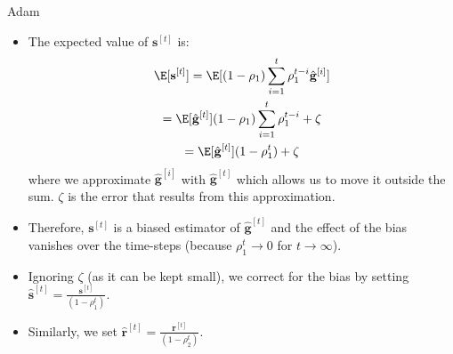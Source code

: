 \begin{vbframe}{Adam}
  
  \begin{itemize}
  \item The expected value  of $\mathbf{s}^{[t]}$ is:
  \footnotesize
  \begin{gather*}
    \E [\mathbf{s}^{[t]}] = \E [ (1 - \rho_1) \sum_{i=1}^t \rho_1^{t - i} \hat{\mathbf{g}}^{[i]}] \\
                = \E [\hat{\mathbf{g}}^{[t]}] (1 - \rho_1) \sum_{i=1}^t \rho_1^{t - i} + \zeta\\
                = \E [\hat{\mathbf{g}}^{[t]}] (1 - \rho_1^{t}) + \zeta
  \end{gather*}
  \normalsize
  where we approximate $\hat{\mathbf{g}}^{[i]}$ with $\hat{\mathbf{g}}^{[t]}$ which allows us to move it outside the sum. $\zeta$ is the error that results from this approximation.
      \item Therefore, $\mathbf{s}^{[t]}$ is a biased estimator of $\hat{\mathbf{g}}^{[t]}$ and the effect of the bias vanishes over the time-steps (because $\rho_1^t \rightarrow 0$ for $t \rightarrow \infty$).
  \item Ignoring $\zeta$ (as it can be kept small), we correct for the bias by setting $\hat{\mathbf{s}}^{[t]} = \frac{\mathbf{s}^{[t]}}{(1 - \rho_1^{t})}$.
  \item Similarly, we set $\hat{\mathbf{r}}^{[t]} = \frac{\mathbf{r}^{[t]}}{(1 - \rho_2^{t})}$.
  \end{itemize}
\end{vbframe}



